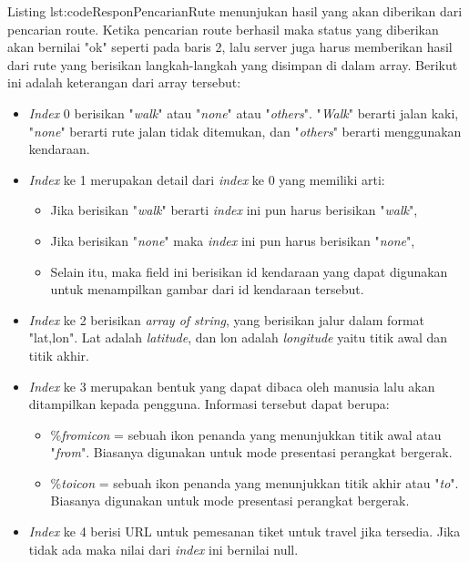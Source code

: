 Listing {lst:codeResponPencarianRute} menunjukan hasil yang akan diberikan dari pencarian route. Ketika pencarian route berhasil maka status yang diberikan akan bernilai "ok" seperti pada baris 2, lalu server juga harus memberikan hasil dari rute yang berisikan langkah-langkah yang disimpan di dalam array. Berikut ini adalah keterangan dari array tersebut:

\begin{itemize}
	\item \textit{Index} 0 berisikan "\textit{walk}" atau "\textit{none}" atau "\textit{others}". "\textit{Walk}" berarti jalan kaki, "\textit{none}" berarti rute jalan tidak ditemukan, dan "\textit{others}" berarti menggunakan kendaraan.
	\item \textit{Index} ke 1 merupakan detail dari \textit{index} ke 0 yang memiliki arti:
	\begin{itemize}
		\item Jika berisikan "\textit{walk}" berarti \textit{index} ini pun harus berisikan "\textit{walk}",
		\item Jika berisikan "\textit{none}" maka \textit{index} ini pun harus berisikan "\textit{none}",
		\item Selain itu, maka field ini berisikan id kendaraan yang dapat digunakan untuk menampilkan gambar dari id kendaraan tersebut.
	\end{itemize}
	\item \textit{Index} ke 2 berisikan \textit{array of string}, yang berisikan jalur dalam format "lat,lon". Lat adalah \textit{latitude}, dan lon adalah \textit{longitude} yaitu titik awal dan titik akhir.
	\item \textit{Index} ke 3 merupakan bentuk yang dapat dibaca oleh manusia lalu akan ditampilkan kepada pengguna. Informasi tersebut dapat berupa:
	\begin{itemize}
		\item \%\textit{fromicon} = sebuah ikon penanda yang menunjukkan titik awal atau "\textit{from}". Biasanya digunakan untuk mode presentasi perangkat bergerak.
		\item \%\textit{toicon} = sebuah ikon penanda yang menunjukkan titik akhir atau "\textit{to}". Biasanya digunakan untuk mode presentasi perangkat bergerak.
	\end{itemize}
	\item \textit{Index} ke 4 berisi URL untuk pemesanan tiket untuk travel jika tersedia. Jika tidak ada maka nilai dari \textit{index} ini bernilai null.
\end{itemize}


